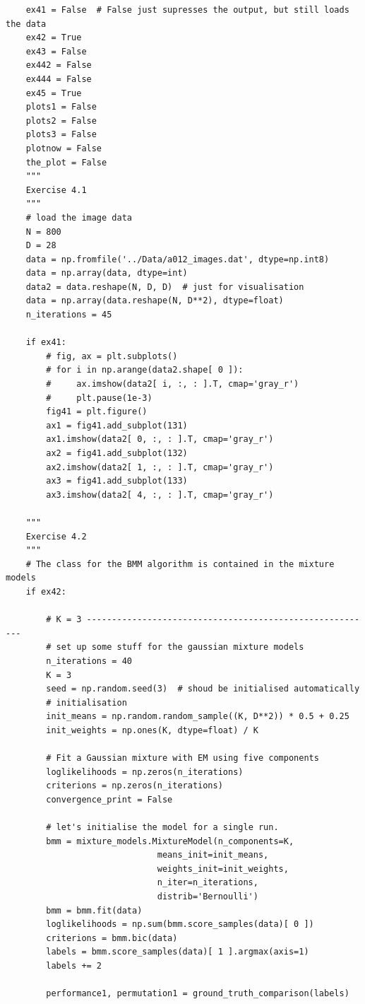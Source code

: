 \begin{verbatim}
    ex41 = False  # False just supresses the output, but still loads the data
    ex42 = True
    ex43 = False
    ex442 = False
    ex444 = False
    ex45 = True
    plots1 = False
    plots2 = False
    plots3 = False
    plotnow = False
    the_plot = False
    """
    Exercise 4.1
    """
    # load the image data
    N = 800
    D = 28
    data = np.fromfile('../Data/a012_images.dat', dtype=np.int8)
    data = np.array(data, dtype=int)
    data2 = data.reshape(N, D, D)  # just for visualisation
    data = np.array(data.reshape(N, D**2), dtype=float)
    n_iterations = 45

    if ex41:
        # fig, ax = plt.subplots()
        # for i in np.arange(data2.shape[ 0 ]):
        #     ax.imshow(data2[ i, :, : ].T, cmap='gray_r')
        #     plt.pause(1e-3)
        fig41 = plt.figure()
        ax1 = fig41.add_subplot(131)
        ax1.imshow(data2[ 0, :, : ].T, cmap='gray_r')
        ax2 = fig41.add_subplot(132)
        ax2.imshow(data2[ 1, :, : ].T, cmap='gray_r')
        ax3 = fig41.add_subplot(133)
        ax3.imshow(data2[ 4, :, : ].T, cmap='gray_r')

    """
    Exercise 4.2
    """
    # The class for the BMM algorithm is contained in the mixture models
    if ex42:

        # K = 3 ---------------------------------------------------------
        # set up some stuff for the gaussian mixture models
        n_iterations = 40
        K = 3
        seed = np.random.seed(3)  # shoud be initialised automatically
        # initialisation
        init_means = np.random.random_sample((K, D**2)) * 0.5 + 0.25
        init_weights = np.ones(K, dtype=float) / K

        # Fit a Gaussian mixture with EM using five components
        loglikelihoods = np.zeros(n_iterations)
        criterions = np.zeros(n_iterations)
        convergence_print = False

        # let's initialise the model for a single run.
        bmm = mixture_models.MixtureModel(n_components=K,
                              means_init=init_means,
                              weights_init=init_weights,
                              n_iter=n_iterations,
                              distrib='Bernoulli')
        bmm = bmm.fit(data)
        loglikelihoods = np.sum(bmm.score_samples(data)[ 0 ])
        criterions = bmm.bic(data)
        labels = bmm.score_samples(data)[ 1 ].argmax(axis=1)
        labels += 2

        performance1, permutation1 = ground_truth_comparison(labels)


\end{verbatim}
